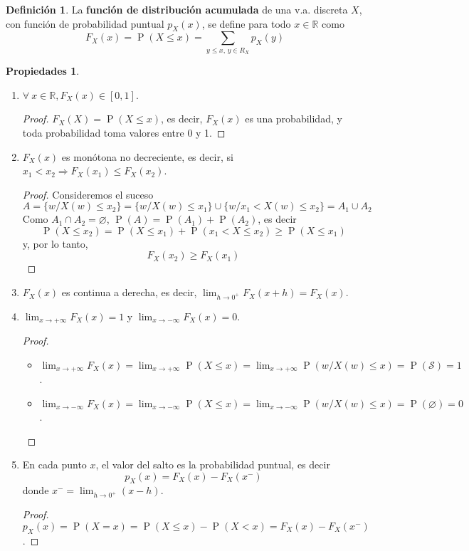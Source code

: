 \documentclass[11pt]{article}
\theoremstyle{plain}
\theoremstyle{definition}
\newtheorem*{defi}{Definición}
\newtheorem*{props}{Propiedades}
\theoremstyle{remark}
\newcommand{\deft}[1]{\textbf{#1}}  %
\newcommand{\proba}{\ensuremath{\operatorname{P}}}  %
\newcommand{\espm}[0]{\ensuremath{\mathcal{S}}}  %
\newcommand{\foralle}{\ensuremath{\forall \ }}  %
\begin{document}
    \begin{defi}
      La \deft{función de distribución acumulada} de una v.a. discreta $X$, con función de probabilidad puntual $p_X(x)$, se define para todo $x \in \mathbb{R}$ como
      \[ F_X(x) = \proba(X \leq x) = \sum_{y \leq x,\, y \in R_X} p_X(y) \]
    \end{defi}

    \begin{props} \ 
      \begin{enumerate}
        \item $\foralle x \in \mathbb{R}, F_X(x) \in [0,1]$.
        \begin{proof}
          $F_X(X) = \proba(X \leq x)$, es decir, $F_X(x)$ es una probabilidad, y toda probabilidad toma valores entre 0 y 1.
        \end{proof}

        \item $F_X(x)$ es monótona no decreciente, es decir, si $x_1 < x_2 \Rightarrow F_X(x_1) \leq F_X(x_2)$.
        \begin{proof}
          Consideremos el suceso
          \[ A = \lbrace w / X(w) \leq x_2 \rbrace = \lbrace w / X(w) \leq x_1 \rbrace \cup \lbrace w / x_1 < X(w) \leq x_2 \rbrace = A_1 \cup A_2 \]
          Como $A_1 \cap A_2 = \varnothing$, $\proba(A) = \proba(A_1) + \proba(A_2)$, es decir
          \[ \proba(X \leq x_2) = \proba(X \leq x_1) + \proba(x_1 < X \leq x_2) \geq \proba(X \leq x_1) \]
          y, por lo tanto,
          \[ F_X(x_2) \geq F_X(x_1) \]
        \end{proof}

        \item $F_X(x)$ es continua a derecha, es decir, $\lim_{h \to 0^+} F_X(x + h) = F_X(x)$.

        \item $\lim_{x \to +\infty} F_X(x) = 1$ y $\lim_{x \to -\infty} F_X(x) = 0$.
        \begin{proof} \ 
          \begin{itemize}
            \item $\lim_{x \to +\infty} F_X(x) = \lim_{x \to +\infty} \proba(X \leq x) = \lim_{x \to +\infty} \proba(w / X(w) \leq x) = \proba(\espm) = 1$.
            \item $\lim_{x \to -\infty} F_X(x) = \lim_{x \to -\infty} \proba(X \leq x) = \lim_{x \to -\infty} \proba(w / X(w) \leq x) = \proba(\varnothing) = 0$.
          \end{itemize}
        \end{proof}

        \item En cada punto $x$, el valor del salto es la probabilidad puntual, es decir
        \[ p_X(x) = F_X(x) - F_X(x^-) \]
        donde $x^- = \lim_{h \to 0^+} (x - h)$.
        \begin{proof}
          $p_X(x) = \proba(X = x) = \proba(X \leq x) - \proba(X < x) = F_X(x) - F_X(x^-)$.
        \end{proof}

      \end{enumerate}
    \end{props}
\end{document}
